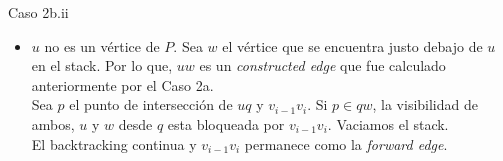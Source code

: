 \documentclass[aspectratio=169,xcolor=dvipsnames, t]{beamer}
\begin{document}

\begin{frame}{Caso 2b.ii}
    \begin{itemize}
        \item $u$ no es un vértice de $P$. Sea $w$ el vértice que se encuentra justo debajo de $u$ en el stack. Por lo que, $uw$ es un \textit{constructed edge} que fue calculado anteriormente por el Caso 2a. \\
        \vspace{0.5cm}
        Sea $p$ el punto de intersección de $uq$ y $v_{i-1}v_{i}$. Si $p \in qw$, la visibilidad de ambos, $u$ y $w$ desde $q$ esta bloqueada por $v_{i-1}v_{i}$. Vaciamos el stack.\\
        \vspace{0.5cm}
        El backtracking continua y $v_{i-1}v_{i}$ permanece como la \textit{forward edge}. \\
    \end{itemize}
\end{frame}

\end{document}
